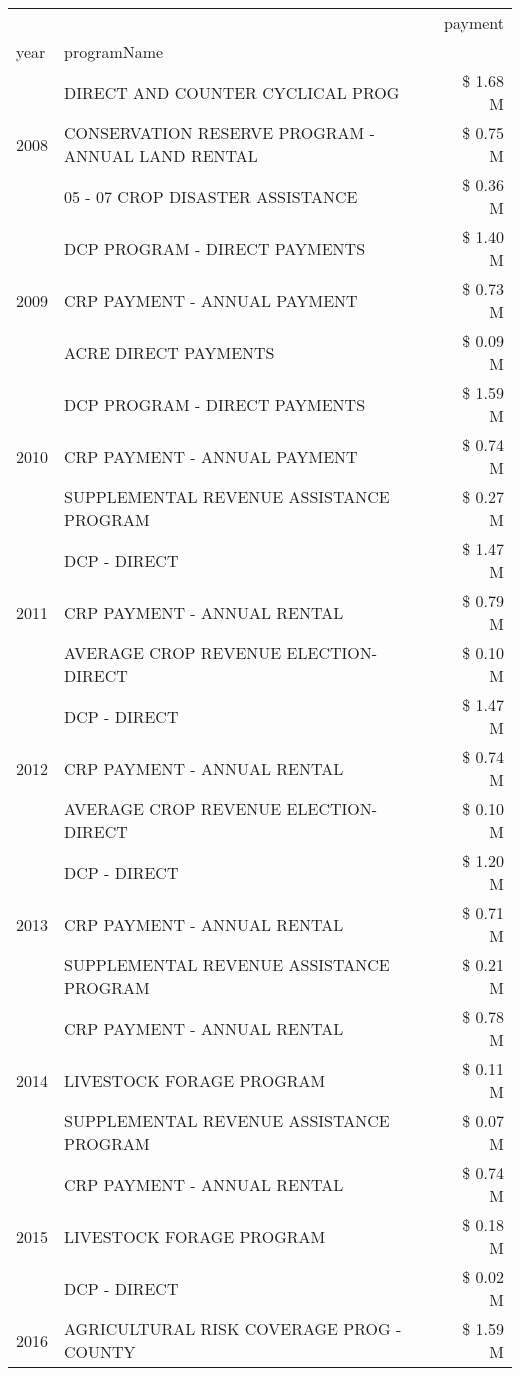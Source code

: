 \begin{tabular}{llr}
\toprule
 &  & payment \\
year & programName &  \\
\midrule
\multirow[t]{3}{*}{2008} & DIRECT AND COUNTER CYCLICAL PROG & \$ 1.68 M \\
 & CONSERVATION RESERVE PROGRAM - ANNUAL LAND RENTAL & \$ 0.75 M \\
 & 05 - 07 CROP DISASTER ASSISTANCE & \$ 0.36 M \\
\cline{1-3}
\multirow[t]{3}{*}{2009} & DCP PROGRAM - DIRECT PAYMENTS & \$ 1.40 M \\
 & CRP PAYMENT - ANNUAL PAYMENT & \$ 0.73 M \\
 & ACRE DIRECT PAYMENTS & \$ 0.09 M \\
\cline{1-3}
\multirow[t]{3}{*}{2010} & DCP PROGRAM - DIRECT PAYMENTS & \$ 1.59 M \\
 & CRP PAYMENT - ANNUAL PAYMENT & \$ 0.74 M \\
 & SUPPLEMENTAL REVENUE ASSISTANCE PROGRAM & \$ 0.27 M \\
\cline{1-3}
\multirow[t]{3}{*}{2011} & DCP - DIRECT & \$ 1.47 M \\
 & CRP PAYMENT - ANNUAL RENTAL & \$ 0.79 M \\
 & AVERAGE CROP REVENUE ELECTION-DIRECT & \$ 0.10 M \\
\cline{1-3}
\multirow[t]{3}{*}{2012} & DCP - DIRECT & \$ 1.47 M \\
 & CRP PAYMENT - ANNUAL RENTAL & \$ 0.74 M \\
 & AVERAGE CROP REVENUE ELECTION-DIRECT & \$ 0.10 M \\
\cline{1-3}
\multirow[t]{3}{*}{2013} & DCP - DIRECT & \$ 1.20 M \\
 & CRP PAYMENT - ANNUAL RENTAL & \$ 0.71 M \\
 & SUPPLEMENTAL REVENUE ASSISTANCE PROGRAM & \$ 0.21 M \\
\cline{1-3}
\multirow[t]{3}{*}{2014} & CRP PAYMENT - ANNUAL RENTAL & \$ 0.78 M \\
 & LIVESTOCK FORAGE PROGRAM & \$ 0.11 M \\
 & SUPPLEMENTAL REVENUE ASSISTANCE PROGRAM & \$ 0.07 M \\
\cline{1-3}
\multirow[t]{3}{*}{2015} & CRP PAYMENT - ANNUAL RENTAL & \$ 0.74 M \\
 & LIVESTOCK FORAGE PROGRAM & \$ 0.18 M \\
 & DCP - DIRECT & \$ 0.02 M \\
\cline{1-3}
\multirow[t]{3}{*}{2016} & AGRICULTURAL RISK COVERAGE PROG - COUNTY      & \$ 1.59 M \\

\end{tabular}
